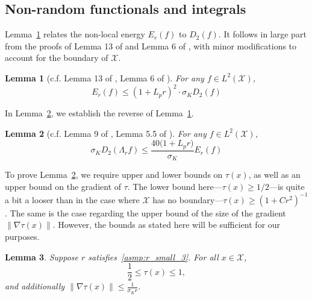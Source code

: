 \documentclass{article}
\newcommand{\1}{\mathbf{1}}
\newcommand{\Xset}{\mathcal{X}}
\newcommand{\Leb}{L}
\theoremstyle{alden}
\theoremstyle{aldenthm}
\newtheorem{lemma}{Lemma}
\theoremstyle{definition}
\theoremstyle{remark}
\begin{document}
\subsection{Non-random functionals and integrals}
\label{subsec:integrals}

Lemma~\ref{lem:first_order_graph_sobolev_seminorm_expected} relates the non-local energy $E_r(f)$ to $D_2(f)$. It follows in large part from the proofs of Lemma 13 of \cite{trillos2019} and Lemma 6 of \cite{burago2014}, with minor modifications to account for the boundary of $\Xset$.
\begin{lemma}[c.f. Lemma 13 of \cite{trillos2019}, Lemma 6 of \cite{burago2014}]
	\label{lem:first_order_graph_sobolev_seminorm_expected}
	For any $f \in \Leb^2(\Xset)$,
	\begin{equation*}
	E_r(f) \leq (1 + L_pr)^2 \cdot \sigma_K D_2(f)
	\end{equation*}
\end{lemma}

In Lemma~\ref{lem:first_order_graph_sobolev_seminorm_expected_lb}, we establish the reverse of Lemma~\ref{lem:first_order_graph_sobolev_seminorm_expected}. 
\begin{lemma}[c.f. Lemma 9 of \cite{trillos2019}, Lemma 5.5 of \cite{burago2014}]
	\label{lem:first_order_graph_sobolev_seminorm_expected_lb}
	For any $f \in \Leb^2(\Xset)$,
	\begin{equation*}
	\sigma_KD_2(\Lambda_rf) \leq \frac{40 \bigl(1 + L_p r\bigr)}{\sigma_K}E_r(f)
	\end{equation*}
\end{lemma}

To prove Lemma~\ref{lem:first_order_graph_sobolev_seminorm_expected_lb}, we require upper and lower bounds on $\tau(x)$, as well as an upper bound on the gradient of $\tau$. The lower bound here---$\tau(x) \geq 1/2$---is quite a bit a looser than in the case where $\Xset$ has no boundary---$\tau(x) \geq (1 + Cr^2)^{-1}$. The same is the case regarding the upper bound of the size of the gradient $\|\nabla \tau(x)\|$. However, the bounds as stated here will be sufficient for our purposes.
\begin{lemma}
	\label{lem:tau_bound}
	Suppose $r$ satisfies~\ref{asmp:r_small_3}. For all $x \in \Xset$,
	\begin{equation*}
	\frac{1}{2} \leq \tau(x) \leq 1,
	\end{equation*}
	and additionally $\|\nabla \tau(x)\| \leq \frac{1}{\sigma_K r}$.
\end{lemma}
\end{document}
